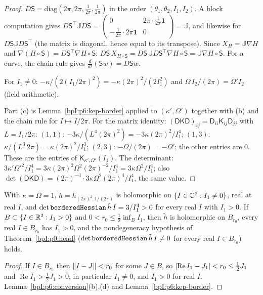 \begin{proof}
\label{stepI:p6:cv-sympl} $D\mathsf S=\mathrm{diag}(2\pi,2\pi,\tfrac1{2\pi},\tfrac1{2\pi})$ in the order $(\theta_1,\theta_2,I_1,I_2)$. A block computation gives
$D\mathsf S^{\top}\mathbb JD\mathsf S=\begin{pmatrix}0&2\pi\cdot\frac1{2\pi}\mathbf 1\\-\frac1{2\pi}\cdot2\pi\mathbf 1&0\end{pmatrix}=\mathbb J$, and likewise for $D\mathsf S\mathbb JD\mathsf S^{\top}$ (the matrix is diagonal, hence equal to its transpose).
Since $X_H=\mathbb J\nabla H$ and $\nabla(H\circ\mathsf S)=D\mathsf S^{\top}\nabla H\circ\mathsf S$:
$D\mathsf S\,X_{H\circ\mathsf S}=D\mathsf S\,\mathbb JD\mathsf S^{\top}\nabla H\circ\mathsf S=\mathbb J\nabla H\circ\mathsf S$. For a curve, the chain rule gives
$\frac{d}{dt}(\mathsf Sw)=D\mathsf S\dot w$.

\label{stepI:p6:cv-ham} For $I_1\ne0$: $-\kappa/(2(I_1/2\pi)^2)=-\kappa(2\pi)^2/(2I_1^2)$ and $\Omega\,I_2/(2\pi)=\Omega'I_2$ (field arithmetic).

\label{stepI:p6:cv-border} Part (c) is Lemma~\ref{bpI:p6:kep-border} applied to $(\kappa',\Omega')$ together with (b) and the chain rule for $I\mapsto I/2\pi$.
For the matrix identity: $(\mathsf D\mathsf K\mathsf D)_{ij}=\mathsf D_{ii}\mathsf K_{ij}\mathsf D_{jj}$ with $L=I_1/2\pi$:
$(1,1)$: $-3\kappa/(L^4(2\pi)^2)=-3\kappa(2\pi)^2/I_1^4$; $(1,3)$: $\kappa/(L^3\,2\pi)=\kappa(2\pi)^2/I_1^3$; $(2,3)$: $-\Omega/(2\pi)=-\Omega'$; the other entries are $0$. These are the entries of $\mathsf K_{\kappa',\Omega'}(I_1)$.
The determinant: $3\kappa'\Omega'^2/I_1^4=3\kappa(2\pi)^2\Omega^2(2\pi)^{-2}/I_1^4=3\kappa\Omega^2/I_1^4$; also $\det(\mathsf D\mathsf K\mathsf D)=(2\pi)^{-4}\cdot3\kappa\Omega^2(2\pi)^4/I_1^4$, the same value.
\end{proof}

\begin{corollary}\label{bpI:p6:nondeg}
With $\kappa=\Omega=1$, $\tilde h=h_{(2\pi)^2,1/(2\pi)}$ is holomorphic on $\{I\in\mathbb{C}^2:I_1\ne0\}$, real at real $I$, and $\det\texttt{borderedHessian}\,\tilde h\,I=3/I_1^4>0$ for every real $I$ with $I_1>0$. If $B\subset\{I\in\mathbb{R}^2:I_1>0\}$ and $0<r_0\le\tfrac12\inf_BI_1$, then $\tilde h$ is holomorphic on $B_{r_0}$, every real $I\in B_{r_0}$ has $I_1>0$, and the nondegeneracy hypothesis of Theorem~\ref{bpI:p0:head} ($\det\texttt{borderedHessian}\,\tilde h\,I\ne0$ for every real $I\in B_{r_0}$) holds.
\end{corollary}
\begin{proof}
\label{stepI:p6:nd-domain} If $I\in B_{r_0}$ then $\lVert I-J\rVert<r_0$ for some $J\in B$, so $\lvert \operatorname{Re}I_1-J_1\rvert<r_0\le\tfrac12J_1$ and $\operatorname{Re}I_1>\tfrac12J_1>0$; in particular $I_1\ne0$, and $I_1>0$ for real $I$.
\label{stepI:p6:nd-concl} Lemma~\ref{bpI:p6:conversion}(b),(d) and Lemma~\ref{bpI:p6:kep-border}.
\end{proof}

